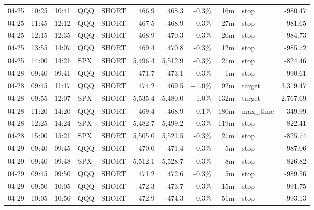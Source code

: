 \documentclass[11pt,a4paper,twoside]{article}
\begin{document}
\begin{center}
\begin{longtable}{>{\color{txtmain}}l l l l l r r r r >{\color{txtmain}}l r}
04-25 & 10:25 & 10:41 & QQQ & SHORT & 466.9 & 468.3 & \textcolor{lossred}{-0.3\%} & 16m & stop & \textcolor{lossred}{-980.47} \\
04-25 & 11:45 & 12:12 & QQQ & SHORT & 467.5 & 468.9 & \textcolor{lossred}{-0.3\%} & 27m & stop & \textcolor{lossred}{-981.65} \\
04-25 & 12:15 & 12:35 & QQQ & SHORT & 468.9 & 470.3 & \textcolor{lossred}{-0.3\%} & 20m & stop & \textcolor{lossred}{-984.73} \\
04-25 & 13:55 & 14:07 & QQQ & SHORT & 469.4 & 470.8 & \textcolor{lossred}{-0.3\%} & 12m & stop & \textcolor{lossred}{-985.72} \\
04-25 & 14:00 & 14:21 & SPX & SHORT & 5,496.4 & 5,512.9 & \textcolor{lossred}{-0.3\%} & 21m & stop & \textcolor{lossred}{-824.46} \\
04-28 & 09:40 & 09:41 & QQQ & SHORT & 471.7 & 473.1 & \textcolor{lossred}{-0.3\%} & 1m & stop & \textcolor{lossred}{-990.61} \\
04-28 & 09:45 & 11:17 & QQQ & SHORT & 474.2 & 469.5 & \textcolor{wingreen}{+1.0\%} & 92m & target & \textcolor{wingreen}{3,319.47} \\
04-28 & 09:55 & 12:07 & SPX & SHORT & 5,535.4 & 5,480.0 & \textcolor{wingreen}{+1.0\%} & 132m & target & \textcolor{wingreen}{2,767.69} \\
04-28 & 11:20 & 14:20 & QQQ & SHORT & 469.4 & 468.9 & \textcolor{wingreen}{+0.1\%} & 180m & max\_time & \textcolor{wingreen}{349.99} \\
04-28 & 12:25 & 14:24 & SPX & SHORT & 5,482.7 & 5,499.2 & \textcolor{lossred}{-0.3\%} & 119m & stop & \textcolor{lossred}{-822.41} \\
04-28 & 15:00 & 15:21 & SPX & SHORT & 5,505.0 & 5,521.5 & \textcolor{lossred}{-0.3\%} & 21m & stop & \textcolor{lossred}{-825.74} \\
04-29 & 09:40 & 09:45 & QQQ & SHORT & 470.0 & 471.4 & \textcolor{lossred}{-0.3\%} & 5m & stop & \textcolor{lossred}{-987.06} \\
04-29 & 09:40 & 09:48 & SPX & SHORT & 5,512.1 & 5,528.7 & \textcolor{lossred}{-0.3\%} & 8m & stop & \textcolor{lossred}{-826.82} \\
04-29 & 09:45 & 09:50 & QQQ & SHORT & 471.2 & 472.6 & \textcolor{lossred}{-0.3\%} & 5m & stop & \textcolor{lossred}{-989.56} \\
04-29 & 09:50 & 10:05 & QQQ & SHORT & 472.3 & 473.7 & \textcolor{lossred}{-0.3\%} & 15m & stop & \textcolor{lossred}{-991.75} \\
04-29 & 10:05 & 10:56 & QQQ & SHORT & 472.9 & 474.3 & \textcolor{lossred}{-0.3\%} & 51m & stop & \textcolor{lossred}{-993.13} \\

\end{longtable}
\end{center}
\end{document}
